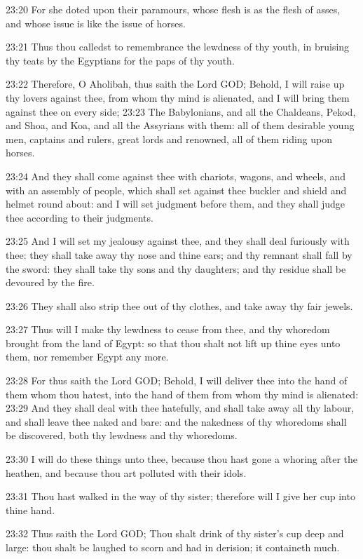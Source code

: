 23:20 For she doted upon their paramours, whose flesh is as the flesh
of asses, and whose issue is like the issue of horses.

23:21 Thus thou calledst to remembrance the lewdness of thy youth, in
bruising thy teats by the Egyptians for the paps of thy youth.

23:22 Therefore, O Aholibah, thus saith the Lord GOD; Behold, I will
raise up thy lovers against thee, from whom thy mind is alienated, and
I will bring them against thee on every side; 23:23 The Babylonians,
and all the Chaldeans, Pekod, and Shoa, and Koa, and all the Assyrians
with them: all of them desirable young men, captains and rulers, great
lords and renowned, all of them riding upon horses.

23:24 And they shall come against thee with chariots, wagons, and
wheels, and with an assembly of people, which shall set against thee
buckler and shield and helmet round about: and I will set judgment
before them, and they shall judge thee according to their judgments.

23:25 And I will set my jealousy against thee, and they shall deal
furiously with thee: they shall take away thy nose and thine ears; and
thy remnant shall fall by the sword: they shall take thy sons and thy
daughters; and thy residue shall be devoured by the fire.

23:26 They shall also strip thee out of thy clothes, and take away thy
fair jewels.

23:27 Thus will I make thy lewdness to cease from thee, and thy
whoredom brought from the land of Egypt: so that thou shalt not lift
up thine eyes unto them, nor remember Egypt any more.

23:28 For thus saith the Lord GOD; Behold, I will deliver thee into
the hand of them whom thou hatest, into the hand of them from whom thy
mind is alienated: 23:29 And they shall deal with thee hatefully, and
shall take away all thy labour, and shall leave thee naked and bare:
and the nakedness of thy whoredoms shall be discovered, both thy
lewdness and thy whoredoms.

23:30 I will do these things unto thee, because thou hast gone a
whoring after the heathen, and because thou art polluted with their
idols.

23:31 Thou hast walked in the way of thy sister; therefore will I give
her cup into thine hand.

23:32 Thus saith the Lord GOD; Thou shalt drink of thy sister's cup
deep and large: thou shalt be laughed to scorn and had in derision; it
containeth much.

